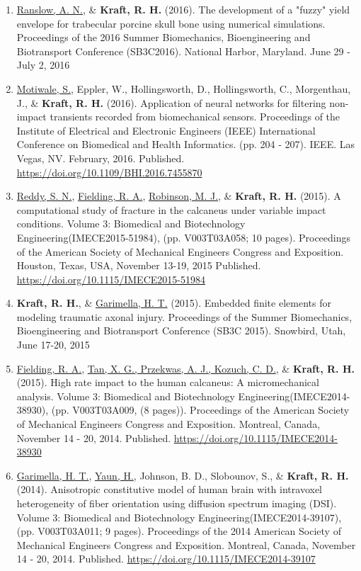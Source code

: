 \documentclass[a4paper,10pt]{article}
\begin{document}
\begin{enumerate}
\item \underline{Ranslow, A. N.}, \& \textbf{\textbf{Kraft,} R. H.} (2016). The development of a "fuzzy" yield envelope for trabecular porcine skull bone using numerical simulations. Proceedings of the 2016 Summer Biomechanics, Bioengineering and Biotransport Conference (SB3C2016). National Harbor, Maryland. June 29 - July 2, 2016
\item \underline{Motiwale, S.}, Eppler, W., Hollingsworth, D., Hollingsworth, C., Morgenthau, J., \& \textbf{\textbf{Kraft,} R. H.} (2016). Application of neural networks for filtering non-impact transients recorded from biomechanical sensors. Proceedings of the Institute of Electrical and Electronic Engineers (IEEE) International Conference on Biomedical and Health Informatics. (pp. 204 - 207). IEEE.  Las Vegas, NV. February, 2016. Published. \url{https://doi.org/10.1109/BHI.2016.7455870}
\item \underline{Reddy, S. N.}, \underline{Fielding, R. A.}, \underline{Robinson, M. J.}, \& \textbf{\textbf{Kraft,} R. H.} (2015). A computational study of fracture in the calcaneus under variable impact conditions. Volume 3: Biomedical and Biotechnology Engineering(IMECE2015-51984), (pp. V003T03A058; 10 pages). Proceedings of the American Society of Mechanical Engineers Congress and Exposition.  Houston, Texas, USA, November 13-19, 2015 Published. \url{https://doi.org/10.1115/IMECE2015-51984}
\item \textbf{\textbf{Kraft,} R. H.}, \& \underline{Garimella, H. T.} (2015). Embedded finite elements for modeling traumatic axonal injury. Proceedings of the Summer Biomechanics, Bioengineering and Biotransport Conference (SB3C 2015). Snowbird, Utah, June 17-20, 2015
\item \underline{Fielding, R. A.}, \underline{Tan, X. G., Przekwas, A. J., Kozuch, C. D.}, \& \textbf{\textbf{Kraft,} R. H.} (2015). High rate impact to the human calcaneus: A micromechanical analysis. Volume 3: Biomedical and Biotechnology Engineering(IMECE2014-38930), (pp. V003T03A009, (8 pages)). Proceedings of the American Society of Mechanical Engineers Congress and Exposition.  Montreal, Canada, November 14 - 20, 2014. Published. \url{https://doi.org/10.1115/IMECE2014-38930}
\item \underline{Garimella, H. T.}, \underline{Yaun, H.}, Johnson, B. D., Slobounov, S., \& \textbf{\textbf{Kraft,} R. H.} (2014). Anisotropic constitutive model of human brain with intravoxel heterogeneity of fiber orientation using diffusion spectrum imaging (DSI). Volume 3: Biomedical and Biotechnology Engineering(IMECE2014-39107), (pp. V003T03A011; 9 pages). Proceedings of the 2014 American Society of Mechanical Engineers Congress and Exposition.  Montreal, Canada, November 14 - 20, 2014. Published. \url{https://doi.org/10.1115/IMECE2014-39107}

\end{enumerate}
\end{document}
